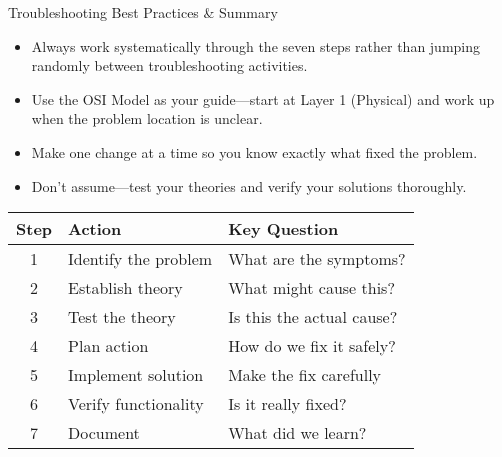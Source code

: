 \documentclass[aspectratio=169]{beamer}
\begin{document}
\begin{frame}{Troubleshooting Best Practices \& Summary}

\begin{itemize}
    \item Always work systematically through the seven steps rather than jumping randomly between troubleshooting activities.
    \item Use the OSI Model as your guide—start at Layer 1 (Physical) and work up when the problem location is unclear.
    \item Make one change at a time so you know exactly what fixed the problem.
    \item Don't assume—test your theories and verify your solutions thoroughly.
\end{itemize}

\vspace{0.2cm}

\begin{table}
\centering
\small
\begin{tabular}{|c|l|l|}
\hline
\rowcolor{networkblue!30}
\textbf{Step} & \textbf{Action} & \textbf{Key Question} \\ \hline
1 & Identify the problem & What are the symptoms? \\ \hline
\rowcolor{gray!10}
2 & Establish theory & What might cause this? \\ \hline
3 & Test the theory & Is this the actual cause? \\ \hline
\rowcolor{gray!10}
4 & Plan action & How do we fix it safely? \\ \hline
5 & Implement solution & Make the fix carefully \\ \hline
\rowcolor{gray!10}
6 & Verify functionality & Is it really fixed? \\ \hline
7 & Document & What did we learn? \\ \hline
\end{tabular}
\end{table}

\end{frame}
\end{document}

